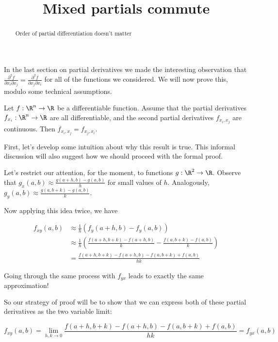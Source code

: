 \documentclass{ximera}
\title{Mixed partials commute}
\begin{document}
	\begin{abstract}
		Order of partial differentiation doesn't matter
	\end{abstract}\maketitle
	
	In the last section on partial derivatives we made the interesting observation that $\frac{\partial^2 f}{\partial x_i \partial x_j} = \frac{\partial^2 f}{\partial x_j \partial x_i}$
	for all of the functions we considered.  We will now prove this, modulo some technical assumptions.
	
	\begin{theorem}
		Let $f:\R^n \to \R$ be a differentiable function.  Assume that the partial derivatives $f_{x_i}:\R^n \to \R$ are all differentiable, and the second partial derivatives
		$f_{x_i,x_j}$ are continuous.  Then $f_{x_i,x_j} = f_{x_j,x_i}$.
	\end{theorem}
	
	First, let's develop some intuition about why this result is true.  This informal discussion will also suggest how we should proceed with the formal proof.
	
	Let's restrict our attention, for the moment, to functions $g: \R^2 \to \R$.  Observe that  $g_{x}(a,b) \approx \frac{g(a+h,b)-g(a,b)}{h}$ for small values of $h$.  Analogously,
	$g_{y}(a,b) \approx \frac{g(a,b+k)-g(a,b)}{k}$.
	
	Now applying this idea twice, we have 
	
	\begin{align*}
		f_{xy}(a,b) &\approx \frac{1}{h} \left( f_y(a+h,b) - f_y(a,b)\right)\\
			&\approx \frac{1}{h} \left( \frac{f(a+h,b+k)-f(a+h,b)}{k} - \frac{f(a,b+k)-f(a,b)}{k}\right)\\
			&=\frac{f(a+h,b+k)-f(a+h,b)-f(a,b+k)+f(a,b)}{hk}
	\end{align*}
	
	Going through the same process with $f_{yx}$ leads to exactly the same approximation!
	
	So our strategy of proof will be to show that we can express both of these partial derivatives as the two variable limit:
	
	\[
		f_{xy}(a,b) = \displaystyle\lim_{h,k \to 0} \frac{f(a+h,b+k)-f(a+h,b)-f(a,b+k)+f(a,b)}{hk} = f_{yx}(a,b)
	\]
	
\end{document}
